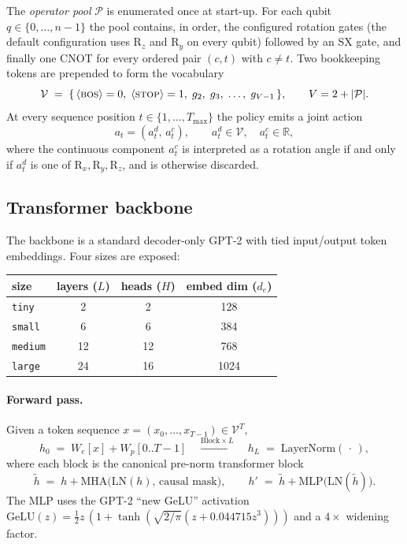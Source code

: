 \documentclass[11pt,a4paper]{article}
\newcommand{\BOS}{\ifmmode\langle\text{\textsc{bos}}\rangle\else$\langle$\textsc{bos}$\rangle$\fi}
\newcommand{\STOP}{\ifmmode\langle\text{\textsc{stop}}\rangle\else$\langle$\textsc{stop}$\rangle$\fi}
\newcommand{\Real}{\mathbb{R}}
\begin{document}
The \emph{operator pool} $\mathcal{P}$ is enumerated once at start-up. For each qubit $q \in \{0, \dots, n-1\}$ the pool contains, in order, the configured rotation gates (the default configuration uses $\mathrm{R}_z$ and $\mathrm{R}_y$ on every qubit) followed by an SX gate, and finally one CNOT for every ordered pair $(c, t)$ with $c \neq t$. Two bookkeeping tokens are prepended to form the vocabulary
\begin{equation}
\mathcal{V} \;=\;
\{\,
\BOS = 0,\;
\STOP = 1,\;
g_2,\; g_3,\; \dots,\; g_{V-1}
\,\},
\qquad V = 2 + |\mathcal{P}|.
\end{equation}
At every sequence position $t \in \{1,\dots, T_{\max}\}$ the policy emits a joint action
\begin{equation}
a_t = (a^d_t,\, a^c_t),
\qquad
a^d_t \in \mathcal{V},\quad a^c_t \in \Real,
\end{equation}
where the continuous component $a^c_t$ is interpreted as a rotation angle if and only if $a^d_t$ is one of $\mathrm{R}_x, \mathrm{R}_y, \mathrm{R}_z$, and is otherwise discarded.

\subsection{Transformer backbone}
\label{sec:transformer}

The backbone is a standard decoder-only GPT-2 with tied input/output token embeddings. Four sizes are exposed:

\begin{center}
\small
\begin{tabular}{lccc}
\toprule
size & layers ($L$) & heads ($H$) & embed dim ($d_{\!e}$)\\
\midrule
\texttt{tiny}   & 2  & 2  & 128 \\
\texttt{small}  & 6  & 6  & 384 \\
\texttt{medium} & 12 & 12 & 768 \\
\texttt{large}  & 24 & 16 & 1024\\
\bottomrule
\end{tabular}
\end{center}

\paragraph{Forward pass.}
Given a token sequence $x = (x_0,\dots,x_{T-1}) \in \mathcal{V}^T$,
\begin{equation}
h_0 \;=\; W_e[x] + W_p[0..T-1]
\quad\xrightarrow{\text{Block} \times L}\quad
h_L \;=\; \mathrm{LayerNorm}(\,\cdot\,),
\end{equation}
where each block is the canonical pre-norm transformer block
\begin{equation}
\tilde{h} \;=\; h + \mathrm{MHA}\bigl(\mathrm{LN}(h),\,\text{causal mask}\bigr),
\qquad
h' \;=\; \tilde{h} + \mathrm{MLP}\bigl(\mathrm{LN}(\tilde{h})\bigr).
\end{equation}
The MLP uses the GPT-2 ``new GeLU'' activation
$\mathrm{GeLU}(z) = \tfrac{1}{2} z\,(1 + \tanh(\sqrt{2/\pi}(z + 0.044715 z^3)))$
and a $4\times$ widening factor.
\end{document}
